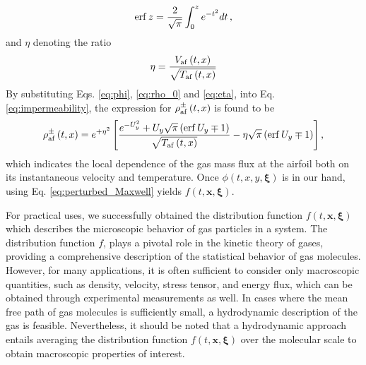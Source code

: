 \begin{equation}
    \operatorname{erf} z
    =
    \frac{2}{\sqrt{\pi}} \int_{0}^{z}e^{-t^2}dt\,,
\end{equation}
and $\eta$ denoting the ratio
\begin{equation} \label{eq:eta}
    \eta
    =
    \frac{V_{\mathrm{af}}\left(t,x\right)}{\sqrt{T_{\mathrm{af}}\left(t,x\right)}}
\end{equation}
By substituting Eqs. \ref{eq:phi}, \ref{eq:rho_0} and \ref{eq:eta}, into Eq. \ref{eq:impermeability}, the expression for $\rho_{\mathrm{af}}^\pm\left(t,x\right)$ is found to be
\begin{equation} \label{eq:rho_af}
    \rho_{\mathrm{af}}^\pm\left(t,x\right)
    =
    e^{+\eta^2}
    \left[ \frac{ e^{-U_y^2} + U_y\sqrt{\pi} \left( \operatorname{erf} U_y \mp 1 \right) }{ \sqrt{T_{\mathrm{af}} \left(t,x\right)} } - \eta\sqrt{\pi} \left( \operatorname{erf} U_y \mp 1 \right) \right]
    ,
\end{equation}
which indicates the local dependence of the gas mass flux at the airfoil both on its instantaneous velocity and temperature. Once $\phi\left(t,x,y,\boldsymbol{\xi}\right)$ is in our hand, using Eq. \ref{eq:perturbed_Maxwell} yields $f(t,\mathbf{x},\boldsymbol{\xi})$.

For practical uses, we successfully obtained the distribution function $f(t,\mathbf{x},\boldsymbol{\xi})$ which describes the microscopic behavior of gas particles in a system. The distribution function $f$, plays a pivotal role in the kinetic theory of gases, providing a comprehensive description of the statistical behavior of gas molecules. However, for many applications, it is often sufficient to consider only macroscopic quantities, such as density, velocity, stress tensor, and energy flux, which can be obtained through experimental measurements as well. In cases where the mean free path of gas molecules is sufficiently small, a hydrodynamic description of the gas is feasible. Nevertheless, it should be noted that a hydrodynamic approach entails averaging the distribution function $f(t,\mathbf{x},\boldsymbol{\xi})$ over the molecular scale to obtain macroscopic properties of interest.

